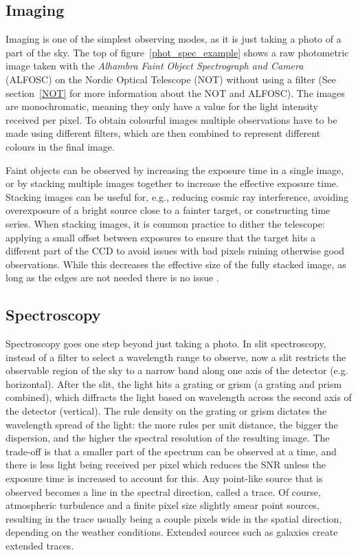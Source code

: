 \documentclass[a4paper,oneside,12pt, class=Latex/Classes/PhDthesisPSnPDF, crop=false]{standalone}
\begin{document}
\subsection{Imaging}
Imaging is one of the simplest observing modes, as it is just taking a photo of a part of the sky. The top of figure~\ref{phot_spec_example} shows a raw photometric image taken with the \textit{Alhambra Faint Object Spectrograph and Camera} (ALFOSC) on the Nordic Optical Telescope (NOT) without using a filter (See section~\ref{NOT} for more information about the NOT and ALFOSC). The images are monochromatic, meaning they only have a value for the light intensity received per pixel. To obtain colourful images multiple observations have to be made using different filters, which are then combined to represent different colours in the final image.

Faint objects can be observed by increasing the exposure time in a single image, or by stacking multiple images together to increase the effective exposure time. Stacking images can be useful for, e.g., reducing cosmic ray interference, avoiding overexposure of a bright source close to a fainter target, or constructing time series. When stacking images, it is common practice to dither the telescope: applying a small offset between exposures to ensure that the target hits a different part of the CCD to avoid issues with bad pixels ruining otherwise good observations. While this decreases the effective size of the fully stacked image, as long as the edges are not needed there is no issue \citep{Stacking_I, Stacking_II}.

\subsection{Spectroscopy}
Spectroscopy goes one step beyond just taking a photo. In slit spectroscopy, instead of a filter to select a wavelength range to observe, now a slit restricts the observable region of the sky to a narrow band along one axis of the detector (e.g. horizontal). After the slit, the light hits a grating or grism (a grating and prism combined), which diffracts the light based on wavelength across the second axis of the detector (vertical). The rule density on the grating or grism dictates the wavelength spread of the light: the more rules per unit distance, the bigger the dispersion, and the higher the spectral resolution of the resulting image. The trade-off is that a smaller part of the spectrum can be observed at a time, and there is less light being received per pixel which reduces the SNR unless the exposure time is increased to account for this. Any point-like source that is observed becomes a line in the spectral direction, called a trace. Of course, atmospheric turbulence and a finite pixel size slightly smear point sources, resulting in the trace usually being a couple pixels wide in the spatial direction, depending on the weather conditions. Extended sources such as galaxies create extended traces.
\end{document}
